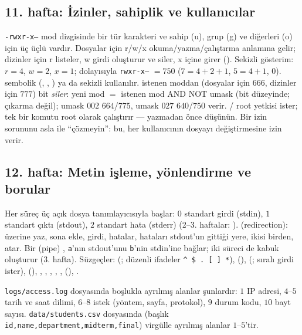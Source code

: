 \subsection{11. hafta: İzinler, sahiplik ve kullanıcılar}
\texttt{-rwxr-x---} mod dizgisinde bir tür karakteri ve sahip (u), grup (g) ve diğerleri (o) için üç üçlü vardır. Dosyalar için r/w/x okuma/yazma/çalıştırma anlamına gelir; dizinler için r listeler, w girdi oluşturur ve siler, x içine girer (). Sekizli gösterim: $r = 4$, $w = 2$, $x = 1$; dolayısıyla \texttt{rwxr-x---} $= 750$ ($7 = 4+2+1$, $5 = 4+1$, $0$).  sembolik (, , ) ya da sekizli kullanılır.  istenen moddan (dosyalar için $666$, dizinler için $777$) bit \emph{siler}: yeni mod $=$ istenen mod AND NOT umask (bit düzeyinde; çıkarma değil); umask $002$ $664$/$775$, umask $027$ $640$/$750$ verir. / root yetkisi ister;  tek bir komutu root olarak çalıştırır --- yazmadan önce düşünün. Bir izin sorununu asla  ile ``çözmeyin'': bu, her kullanıcının dosyayı değiştirmesine izin verir.


\subsection{12. hafta: Metin işleme, yönlendirme ve borular}
Her süreç üç açık dosya tanımlayıcısıyla başlar: $0$ standart girdi (stdin), $1$ standart çıktı (stdout), $2$ standart hata (stderr) (2--3. haftalar: ).  (redirection): \cmd{>} üzerine yaz, \cmd{>>} sona ekle, \cmd{<} girdi,  hatalar,  hataları stdout'un gittiği yere, \cmd{\&>} ikisi birden,  atar. Bir  (pipe) , \texttt{a}'nın stdout'unu \texttt{b}'nin stdin'ine bağlar; iki süreci de kabuk oluşturur (3. hafta). Süzgeçler:  (; düzenli ifadeler \texttt{\^{} \$ . [ ] *}),  (),  (; sıralı girdi ister),  (), , , , , ,  (), .

\texttt{logs/access.log} dosyasında boşlukla ayrılmış alanlar şunlardır: $1$ IP adresi, $4$--$5$ tarih ve saat dilimi, $6$--$8$ istek (yöntem, sayfa, protokol), $9$ durum kodu, $10$ bayt sayısı. \texttt{data/students.csv} dosyasında (başlık \texttt{id,name,department,midterm,final}) virgülle ayrılmış alanlar $1$--$5$'tir.

